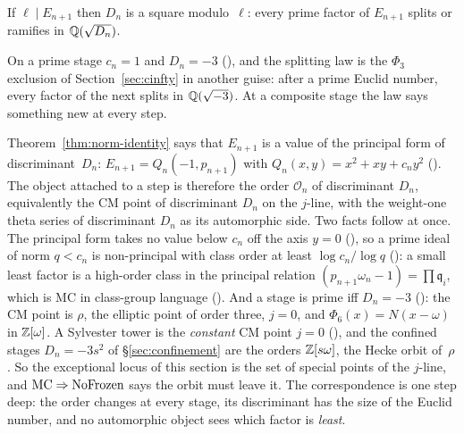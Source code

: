 \begin{theorem}
\label{thm:splitting-law}
If $\ell \mid E_{n+1}$ then $D_n$ is a square modulo~$\ell$: every prime
factor of $E_{n+1}$ splits or ramifies in $\mathbb{Q}(\sqrt{D_n})$.
\end{theorem}

On a prime stage $c_n = 1$ and $D_n = -3$
(),
and the splitting law is the $\Phi_3$ exclusion of Section~\ref{sec:cinfty}
in another guise: after a prime Euclid number, every factor of the next
splits in $\mathbb{Q}(\sqrt{-3})$.  At a composite stage the law says something
new at every step.

\begin{remark}
\label{rem:cm-point}
Theorem~\ref{thm:norm-identity} says that $E_{n+1}$ is a value of the
principal form of discriminant~$D_n$: $E_{n+1} = Q_n(-1, p_{n+1})$ with
$Q_n(x,y) = x^2 + xy + c_n y^2$
().
The object attached to a step is therefore the order $\mathcal O_n$ of
discriminant $D_n$, equivalently the CM point of discriminant $D_n$ on
the $j$-line, with the weight-one theta series of discriminant $D_n$ as
its automorphic side.  Two facts follow at once.  The principal form
takes no value below $c_n$ off the axis $y = 0$
(), so a
prime ideal of norm $q < c_n$ is non-principal with class order at least
$\log c_n/\log q$
(): a small
least factor is a high-order class in the principal relation
$(p_{n+1}\omega_n - 1) = \prod \mathfrak q_i$, which is MC in class-group
language
().
And a stage is prime iff $D_n = -3$
(): the CM
point is $\rho$, the elliptic point of order three, $j = 0$, and
$\Phi_6(x) = N(x - \omega)$ in $\mathbb{Z}[\omega]$.  A Sylvester tower is the
\emph{constant} CM point $j = 0$
(), and
the confined stages $D_n = -3s^2$ of \S\ref{sec:confinement} are the
orders $\mathbb{Z}[s\omega]$, the Hecke orbit of~$\rho$.  So the exceptional
locus of this section is the set of special points of the $j$-line, and
$\mathrm{MC} \Rightarrow \mathrm{NoFrozen}$ says the orbit must leave it.  The
correspondence is one step deep: the order changes at every stage, its
discriminant has the size of the Euclid number, and no automorphic
object sees which factor is \emph{least}.
\end{remark}


